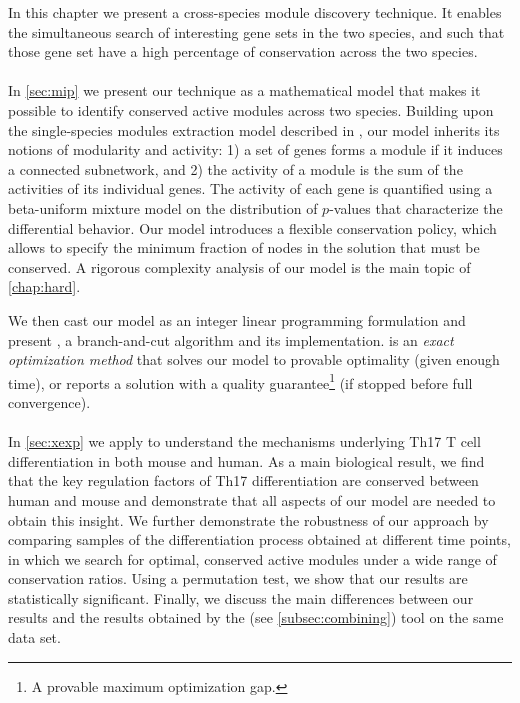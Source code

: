 In this chapter we present a cross-species module discovery technique.
It enables the simultaneous search of interesting gene sets in the two species, and such that those gene set have a high percentage of conservation across the two species.

\paragraph{}
In \cref{sec:mip} we present our technique as a mathematical model that makes it possible to identify conserved active modules across two species.
Building upon the single-species modules extraction model described in \parencite{dittrich2008identifying}, our model inherits its notions of modularity and activity: 1) a set of genes forms a module if it induces a connected subnetwork, and 2) the activity of a module is the sum of the activities of its individual genes.
The activity of each gene is quantified using a beta-uniform mixture model on the distribution of $p$-values that characterize the differential behavior.
Our model introduces a flexible conservation policy, which allows to specify the minimum fraction of nodes in the solution that must be conserved.
A rigorous complexity analysis of our model is the main topic of \cref{chap:hard}.

We then cast our model as an integer linear programming formulation and present \xheinz{}, a branch-and-cut algorithm and its implementation.
\xheinz{} is an \emph{exact optimization method} that solves our model to provable optimality (given enough time), or reports a solution with a quality guarantee\footnote{A provable maximum optimization gap.} (if stopped before full convergence).

\paragraph{}
In \cref{sec:xexp} we apply \xheinz{} to understand the mechanisms underlying Th17 T cell differentiation in both mouse and human.
As a main biological result, we find that the key regulation factors of Th17 differentiation are conserved between human and mouse and demonstrate that all aspects of our model are needed to obtain this insight.
We further demonstrate the robustness of our approach by comparing samples of the differentiation process obtained at different time points, in which we search for optimal, conserved active modules under a wide range of conservation ratios.
Using a permutation test, we show that our results are statistically significant. Finally, we discuss the main differences between our results and the results obtained by the \nexus{} (see \cref{subsec:combining}) tool on the same data set.

